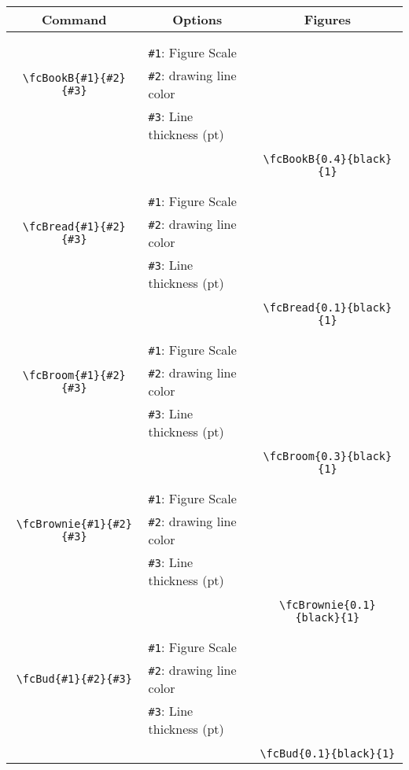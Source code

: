 \documentclass[x11names]{article}
\begin{document}
\begin{table}[H]\centering\begin{tabular}{|c|l|c|}\hline {\bf Command}& \multicolumn{1}{c|}{{\bf Options}} & {\bf Figures}\\  \hline	&&\multirow{5}{*}{\fcBookB{0.4}{black}{1}}\\	&&\\	&\verb|#1|: Figure Scale &\\	\verb|\fcBookB{#1}{#2}{#3}|&	\verb|#2|: drawing line color &\\	&\verb|#3|: Line thickness (pt) &\\ &&\\&&	\verb|\fcBookB{0.4}{black}{1}|\\\hline 	
	&&\multirow{5}{*}{\fcBread{0.1}{black}{1}}\\	&&\\	&\verb|#1|: Figure Scale &\\	\verb|\fcBread{#1}{#2}{#3}|&	\verb|#2|: drawing line color &\\	&\verb|#3|: Line thickness (pt) &\\ &&\\&&	\verb|\fcBread{0.1}{black}{1}|\\\hline 	
	&&\multirow{5}{*}{\fcBroom{0.3}{black}{1}}\\	&&\\	&\verb|#1|: Figure Scale &\\	\verb|\fcBroom{#1}{#2}{#3}|&	\verb|#2|: drawing line color &\\	&\verb|#3|: Line thickness (pt) &\\ &&\\&&	\verb|\fcBroom{0.3}{black}{1}|\\\hline 	
	&&\multirow{5}{*}{\fcBrownie{0.1}{black}{1}}\\	&&\\	&\verb|#1|: Figure Scale &\\	\verb|\fcBrownie{#1}{#2}{#3}|&	\verb|#2|: drawing line color &\\	&\verb|#3|: Line thickness (pt) &\\ &&\\&&	\verb|\fcBrownie{0.1}{black}{1}|\\\hline 	
	&&\multirow{5}{*}{\fcBud{0.1}{black}{1}}\\	&&\\	&\verb|#1|: Figure Scale &\\	\verb|\fcBud{#1}{#2}{#3}|&	\verb|#2|: drawing line color &\\	&\verb|#3|: Line thickness (pt) &\\ &&\\&&	\verb|\fcBud{0.1}{black}{1}|\\\hline 	

\end{tabular}
\end{table}
\end{document}

